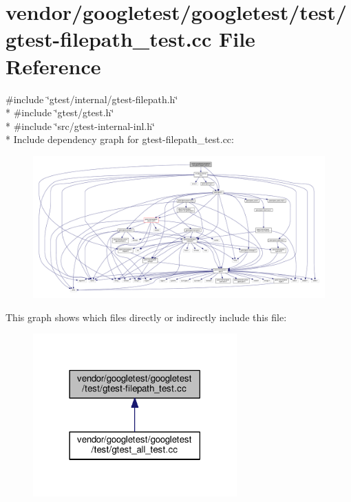\hypertarget{gtest-filepath__test_8cc}{}\section{vendor/googletest/googletest/test/gtest-\/filepath\+\_\+test.cc File Reference}
\label{gtest-filepath__test_8cc}
{\ttfamily \#include \char`\"{}gtest/internal/gtest-\/filepath.\+h\char`\"{}}\\*
{\ttfamily \#include \char`\"{}gtest/gtest.\+h\char`\"{}}\\*
{\ttfamily \#include \char`\"{}src/gtest-\/internal-\/inl.\+h\char`\"{}}\\*
Include dependency graph for gtest-\/filepath\+\_\+test.cc\+:
\nopagebreak
\begin{figure}[H]
\begin{center}
\leavevmode
\includegraphics[width=350pt]{gtest-filepath__test_8cc__incl}
\end{center}
\end{figure}
This graph shows which files directly or indirectly include this file\+:
\nopagebreak
\begin{figure}[H]
\begin{center}
\leavevmode
\includegraphics[width=222pt]{gtest-filepath__test_8cc__dep__incl}
\end{center}
\end{figure}
